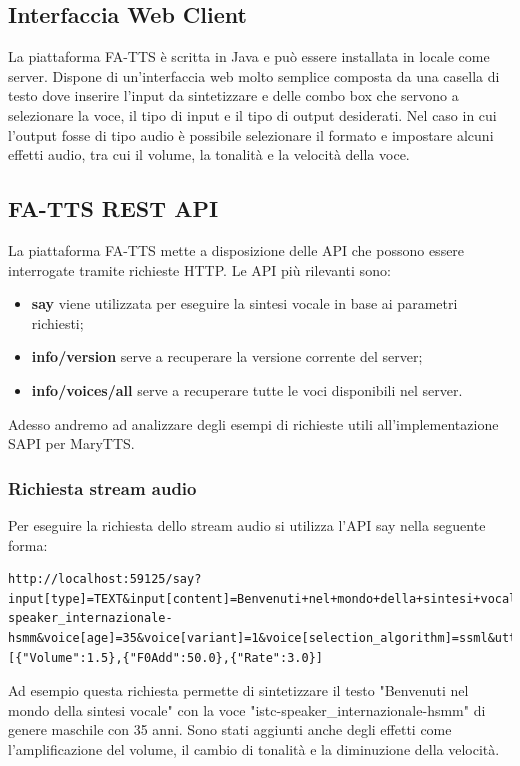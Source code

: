 \subsection{Interfaccia Web Client}
La piattaforma FA-TTS è scritta in Java e può essere installata in locale come server.
Dispone di un'interfaccia web molto semplice composta da una casella di testo dove inserire l'input da sintetizzare e delle combo box che servono a selezionare la voce, il tipo di input e il tipo di output desiderati.
Nel caso in cui l'output fosse di tipo audio è possibile selezionare il formato e impostare alcuni effetti audio, tra cui il volume, la tonalità e la velocità della voce.
\subsection{FA-TTS REST API}
La piattaforma FA-TTS mette a disposizione delle API che possono essere interrogate tramite richieste HTTP.
Le API più rilevanti sono:
\begin{itemize}
	\item \textbf{say} viene utilizzata per eseguire la sintesi vocale in base ai parametri richiesti;
	\item \textbf{info/version} serve a recuperare la versione corrente del server;
	\item \textbf{info/voices/all} serve a recuperare tutte le voci disponibili nel server.
\end{itemize}
Adesso andremo ad analizzare degli esempi di richieste utili all'implementazione SAPI per MaryTTS.
\subsubsection{Richiesta stream audio}
Per eseguire la richiesta dello stream audio si utilizza l'API say nella seguente forma:
\lstset{language=html,
		basicstyle=\ttfamily,
		columns=fullflexible,
		showstringspaces=false,
		breaklines=true }
\begin{lstlisting}
http://localhost:59125/say?input[type]=TEXT&input[content]=Benvenuti+nel+mondo+della+sintesi+vocale.&input[locale]=it&output[type]=AUDIO&output[format]=WAVE_FILE&voice[gender]=male&voice[name]=istc-speaker_internazionale-hsmm&voice[age]=35&voice[variant]=1&voice[selection_algorithm]=ssml&utterance[effects]=[{"Volume":1.5},{"F0Add":50.0},{"Rate":3.0}]
\end{lstlisting}
Ad esempio questa richiesta permette di sintetizzare il testo "Benvenuti nel mondo della sintesi vocale" con la voce "istc-speaker\_internazionale-hsmm" di genere maschile con 35 anni.
Sono stati aggiunti anche degli effetti come l'amplificazione del volume, il cambio di tonalità e la diminuzione della velocità.
